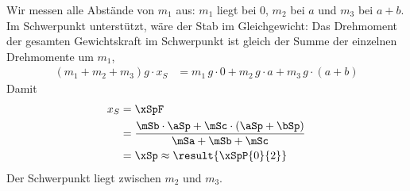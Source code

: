 Wir messen alle Abstände von $m_1$ aus: $m_1$ liegt bei $0$, $m_2$ bei $a$ und $m_3$ bei $a+b$. Im Schwerpunkt unterstützt, wäre der Stab im Gleichgewicht: Das Drehmoment der gesamten Gewichtskraft im Schwerpunkt ist gleich der Summe der einzelnen Drehmomente um $m_1$,
\begin{align}
 \left(m_1+m_2+m_3\right)g\cdot x_S &= m_1\,g\cdot 0 + m_2\,g\cdot a + m_3\,g\cdot\left(a+b\right)
\end{align}
Damit
\begin{align}
 x_S &= \xSpF \\
   &= \frac{\mSb\cdot\aSp+\mSc\cdot\left(\aSp+\bSp\right)}{\mSa+\mSb+\mSc} \\
   &= \xSp \approx \result{\xSpP{0}{2}}
\end{align}
Der Schwerpunkt liegt zwischen $m_2$ und $m_3$.

\begin{center}
\end{center}
